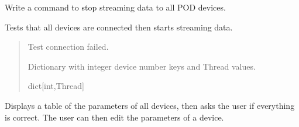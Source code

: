 \documentclass[letterpaper,10pt,english]{sphinxmanual}
\begin{document}
\begin{fulllineitems}
\begin{fulllineitems}
\label{\detokenize{Setup_PodInterface:Setup_PodInterface.Setup_Interface.StopStream}}
\pysigstartsignatures
{}
\pysigstopsignatures
\sphinxAtStartPar
Write a command to stop streaming data to all POD devices.

\end{fulllineitems}


\begin{fulllineitems}
\label{\detokenize{Setup_PodInterface:Setup_PodInterface.Setup_Interface.Stream}}
\pysigstartsignatures
{}
\pysigstopsignatures
\sphinxAtStartPar
Tests that all devices are connected then starts streaming data.
\begin{quote}\begin{description}
\sphinxAtStartPar
{} \textendash{} Test connection failed.

\sphinxAtStartPar
Dictionary with integer device number keys and Thread values.

\sphinxAtStartPar
dict{[}int,Thread{]}

\end{description}\end{quote}

\end{fulllineitems}


\begin{fulllineitems}
\label{\detokenize{Setup_PodInterface:Setup_PodInterface.Setup_Interface.ValidateParams}}
\pysigstartsignatures
{}
\pysigstopsignatures
\sphinxAtStartPar
Displays a table of the parameters of all devices, then asks the user if everything         is correct. The user can then edit the parameters of a device.


\end{fulllineitems}
\end{fulllineitems}
\end{document}
